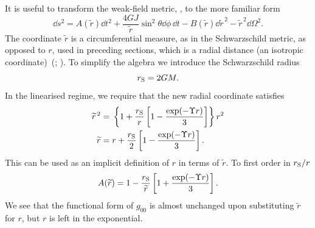 It is useful to transform the weak-field metric, , to the more familiar form
\begin{equation}
\dd s^2 = A(\widetilde{r}) \dd t^2 + \dfrac{4GJ}{\widetilde{r}} \sin^2\theta \dd \phi \,\dd t - B(\widetilde{r})\dd \widetilde{r}^{\,2} - \widetilde{r}^{\,2} \dd \Omega^2.
\label{eq:Sph_sym}
\end{equation}
The coordinate $\widetilde{r}$ is a circumferential measure, as in the Schwarzschild metric, as opposed to $r$, used in preceding sections, which is a radial distance (an isotropic coordinate)~(\citealt[section 40.1]{Misner1973}; \citealt{Olmo2007c}). To simplify the algebra we introduce the Schwarzschild radius
\begin{equation}
r_\mathrm{S} = 2GM.
\end{equation}
In the linearised regime, we require that the new radial coordinate satisfies
\begin{align}
\widetilde{r}^{\,2} = {} & \left\{1 + \dfrac{r_\mathrm{S}}{r}\left[1 - \dfrac{\exp(-\Upsilon r)}{3}\right]\right\}r^2 \\
\widetilde{r} = {} & r + \dfrac{r_\mathrm{S}}{2}\left[1 - \dfrac{\exp(-\Upsilon r)}{3}\right].
\label{eq:r_tilde}
\end{align}
This can be used as an implicit definition of $r$ in terms of $\widetilde{r}$. To first order in ${r_\mathrm{S}}/{r}$ \citep{Olmo2007c}
\begin{equation}
A(\widetilde{r}) = 1 - \dfrac{r_\mathrm{S}}{\widetilde{r}}\left[1 + \dfrac{\exp(-\Upsilon r )}{3}\right].
\label{eq:A_metric}
\end{equation}
We see that the functional form of $g_{00}$ is almost unchanged upon substituting $\widetilde{r}$ for $r$, but $r$ is left in the exponential.

